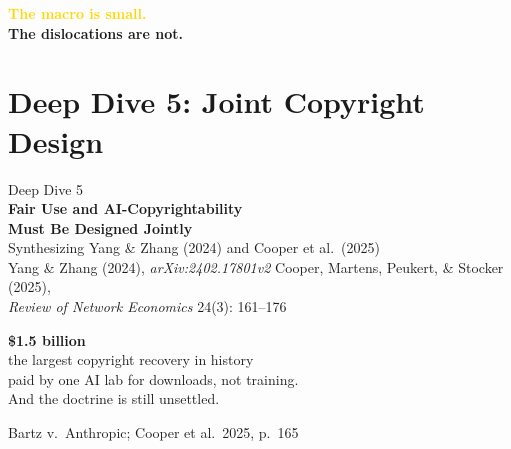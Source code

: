 \documentclass[aspectratio=169,11pt]{beamer}
\begin{document}
{
\begin{frame}[plain]
\vfill
\begin{center}
{\huge\bfseries\textcolor{Gold}{The macro is small.}}\\[0.6cm]
{\huge\bfseries\textcolor{SoftWhite}{The dislocations are \alert{not}.}}
\end{center}
\vfill
\end{frame}}


\section{Deep Dive 5: Joint Copyright Design}

{
\begin{frame}[plain]
\vfill
\begin{center}
{\large\textcolor{WarmGray}{Deep Dive 5}}\\[0.4cm]
{\Huge\bfseries\textcolor{DeepNavy}{Fair Use and AI-Copyrightability}}\\[0.2cm]
{\Huge\bfseries\textcolor{DeepNavy}{Must Be Designed Jointly}}\\[0.4cm]
{\large\textcolor{WarmGray}{Synthesizing Yang \& Zhang (2024) and Cooper et al.\ (2025)}}\\[0.8cm]
\footnotesize\textcolor{WarmGray}{%
Yang \& Zhang (2024), \emph{arXiv:2402.17801v2} \quad\textbar\quad
Cooper, Martens, Peukert, \& Stocker (2025),\\ \emph{Review of Network Economics} 24(3): 161--176}
\end{center}
\vfill
\end{frame}}

\begin{frame}[plain]
\vfill
\begin{center}
{\Huge\bfseries\textcolor{DeepRed}{\$1.5 billion}}\\[0.3cm]
{\large\textcolor{DeepNavy}{the largest copyright recovery in history}}\\[0.6cm]
{\large\textcolor{WarmGray}{paid by one AI lab \textemdash{} for downloads, not training.}}\\[1.2cm]
{\Large\textcolor{DeepNavy}{And the doctrine is still unsettled.}}
\end{center}
\vfill
\begin{flushright}
\scriptsize\textcolor{WarmGray}{Bartz v.\ Anthropic; Cooper et al.\ 2025, p.~165}
\end{flushright}
\end{frame}
\end{document}
